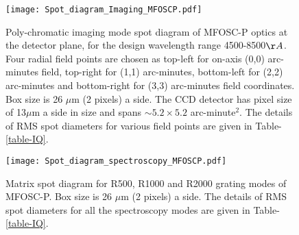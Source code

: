\begin{figure}
	\centering
	\texttt{[image: Spot\_diagram\_Imaging\_MFOSCP.pdf]}
	\vspace{0.2cm}
	\caption{Poly-chromatic imaging mode spot diagram of MFOSC-P optics at the detector plane, for the design wavelength range 4500-8500$\AA$. Four radial field points are chosen as top-left for on-axis (0,0) arc-minutes field, top-right for (1,1) arc-minutes, bottom-left for (2,2) arc-minutes and bottom-right for (3,3) arc-minutes field coordinates. Box size is 26 $\mu$m (2 pixels) a side. The CCD detector has pixel size of 13$\mu$m a side in size and spans $\sim 5.2\times5.2$ arc-minute$^2$. The details of RMS spot diameters for various field points are given in Table-\ref{table-IQ}.}
	\label{fig-SpotDiagram}
\end{figure}


\begin{figure}
	\centering
	\texttt{[image: Spot\_diagram\_spectroscopy\_MFOSCP.pdf]}
	\vspace{0.2cm}
	\caption{Matrix spot diagram for R500, R1000 and R2000 grating modes of MFOSC-P. Box size is 26 $\mu$m (2 pixels) a side. The details of RMS spot diameters for all the spectroscopy modes are given in Table-\ref{table-IQ}.}
	\label{fig-MatrixDiagram-R500}
\end{figure}

